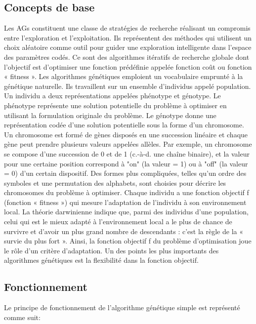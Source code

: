 \documentclass[12pt,a4paper]{article}
\begin{document}
	\subsection{Concepts de base}
	Les AGs constituent une classe de stratégies de recherche réalisant un compromis entre l’exploration et l’exploitation. Ils représentent des méthodes qui utilisent
un choix aléatoire comme outil pour guider une exploration intelligente dans l’espace des paramètres codés. Ce sont des algorithmes itératifs de recherche globale dont l’objectif est d’optimiser une fonction prédéfinie appelée fonction coût ou fonction « fitness ».
	Les algorithmes génétiques emploient un vocabulaire emprunté à la génétique naturelle. Ils travaillent sur un ensemble d’individus appelé population. Un individu a deux représentations appelées phénotype et génotype. Le phénotype représente une solution potentielle du problème à optimiser en utilisant la formulation originale du problème. Le génotype donne une représentation codée
d’une solution potentielle sous la forme d’un chromosome. Un chromosome est formé de gènes disposés en une succession linéaire et chaque gène peut prendre plusieurs
valeurs appelées allèles. Par exemple, un chromosome se compose d’une succession de 0 et de 1 (c.-à-d. une chaîne binaire), et la valeur pour une certaine position correspond à "on" (la valeur = 1) ou à "off" (la valeur = 0) d’un certain dispositif. Des formes plus compliquées, telles qu’un ordre des symboles et une permutation des alphabets, sont choisies pour décrire les chromosomes du problème à optimiser. Chaque individu a une fonction objectif f (fonction « fitness ») qui mesure l’adaptation de l’individu à son environnement local. La théorie darwinienne indique que, parmi des individus d’une population, celui qui est le mieux adapté à l’environnement local a le plus de chance de survivre et d’avoir un plus grand nombre de descendants : c’est la règle de la « survie du plus fort ». Ainsi, la
fonction objectif f du problème d’optimisation joue le rôle d’un critère d’adaptation. Un des points les plus importants des algorithmes génétiques est la flexibilité dans la fonction objectif.

	\subsection{Fonctionnement}
	
	Le principe de fonctionnement de l'algorithme génétique simple est représenté comme suit: \\
	 
\end{document}
